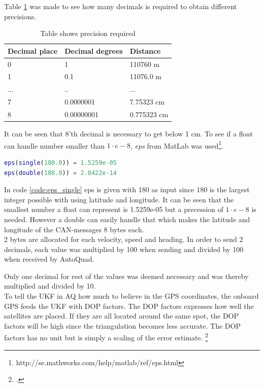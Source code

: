 Table \ref{tab:precision_latlon} was made to see how many decimals is required to obtain different precisions.
\begin{table}[H]
\centering
\caption{Table shows precision required}
\label{tab:precision_latlon}
\begin{tabular}{@{}|l|l|l|@{}}
\toprule
Decimal place & Decimal degrees & Distance    \\ \midrule
0             & 1               & 110760 m    \\ \midrule
1             & 0.1             & 11076.0 m   \\ \midrule
...           & ..              & ...         \\ \midrule
7             & 0.0000001       & 7.75323 cm  \\ \midrule
8             & 0.00000001      & 0.775323 cm \\ \bottomrule
\end{tabular}
\end{table}

It can be seen that 8'th decimal is necessary to get below 1 cm. 
To see if a float can handle number smaller than $1\cdot e-8$, \textit{eps} from MatLab was used\footnote{http://se.mathworks.com/help/matlab/ref/eps.html}.
\begin{lstlisting}[language = matlab, caption = Check if float is precise enough of a double has to be used, label=code:eps_single]
eps(single(180.0)) = 1.5259e-05
eps(double(180.0)) = 2.8422e-14
\end{lstlisting}
In code \ref{code:eps_single} eps is given with 180 as input since 180 is the largest integer possible with using latitude and longitude.
It can be seen that the smallest number a float can represent is 1.5259e-05 but a precession of $1\cdot e-8$ is needed.
However a double can easily handle that which makes the latitude and longitude of the CAN-messages 8 bytes each. \\

2 bytes are allocated for each velocity, speed and heading. In order to send 2 decimals, each value was multiplied by 100 when sending and divided by 100 when received by AutoQuad.

Only one decimal for rest of the values was deemed necessary and was thereby multiplied and divided by 10. \\

To tell the UKF in AQ how much to believe in the GPS coordinates, the onboard GPS feeds the UKF with DOP factors. The DOP factors expresses how well the satellites are placed. If they are all located around the same spot, the DOP factors will be high since the triangulation becomes less accurate. The DOP factors has no unit but is simply a scaling of the error estimate. \footcite{kelddueholmmikkellaurentziusannab.o.jensen2015}


